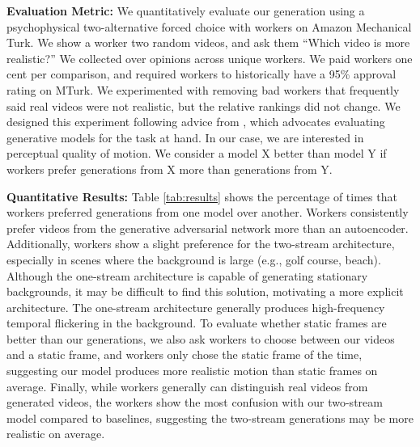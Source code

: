 \documentclass{article}
\begin{document}
\textbf{Evaluation Metric:} We quantitatively evaluate our generation using a psychophysical two-alternative forced choice with workers on Amazon Mechanical Turk. We show a worker two random videos, and ask them ``Which video is more realistic?'' We collected over  opinions across  unique workers. We paid workers one cent per comparison, and required workers to historically have a 95\% approval rating on MTurk. We experimented with removing bad workers that frequently said real videos were not realistic, but the relative rankings did not change. We designed this experiment following advice from \cite{theis2015note}, which advocates evaluating generative models for the task at hand. In our case, we are interested in perceptual quality of motion. We consider a model X better than model Y if workers prefer generations from X more than generations from Y. 

\textbf{Quantitative Results:} Table \ref{tab:results} shows the percentage of times that workers preferred generations from one model over another. Workers consistently prefer videos from the generative adversarial network more than an autoencoder. Additionally, workers show a slight preference for the two-stream architecture, especially in scenes where the background is large (e.g., golf course, beach). Although the one-stream architecture is capable of generating stationary backgrounds, it may be difficult to find this solution, motivating a more explicit architecture. The one-stream architecture generally produces high-frequency temporal flickering in the background. To evaluate whether static frames are better than our generations, we also ask workers to choose between our videos and a static frame, and workers only chose the static frame  of the time, suggesting our model produces more realistic motion than static frames on average. Finally, while workers 
generally can distinguish real videos from generated videos, the workers show the most confusion with our two-stream model compared to baselines, suggesting the two-stream generations may be more realistic on average.
\end{document}
